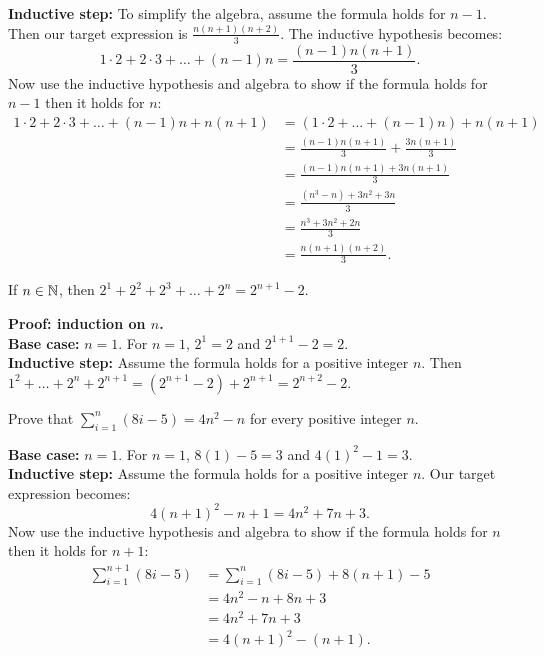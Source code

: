\documentclass{article}
\begin{document}
\textbf{Inductive step:} To simplify the algebra, assume the formula holds for $n - 1$. Then our target expression is $\frac{n(n+1)(n+2)}{3}$. The inductive hypothesis becomes:
$$1\cdot 2 + 2\cdot 3 + \ldots + (n-1)n = \frac{(n-1)n(n+1)}{3}.$$
Now use the inductive hypothesis and algebra to show if the formula holds for $n-1$ then it holds for $n$:
\begin{align*}
    1\cdot 2 + 2\cdot 3 + \ldots + (n-1)n + n(n+1) & = (1\cdot 2 + \ldots + (n-1)n) + n(n+1)     \\
                                                   & = \frac{(n-1)n(n+1)}{3} + \frac{3n(n+1)}{3} \\
                                                   & = \frac{(n-1)n(n+1) + 3n(n+1)}{3}           \\
                                                   & = \frac{(n^3 - n) + 3n^2 + 3n}{3}           \\
                                                   & = \frac{n^3 + 3n^2 + 2n}{3}                 \\
                                                   & = \frac{n(n+1)(n+2)}{3}.
\end{align*}

\begin{problem}
If $n \in \mathbb{N}$, then $2^1 + 2^2 + 2^3 + \ldots + 2^n = 2^{n+1} - 2$.
\end{problem}

\textbf{Proof: induction on $n$.}
\\

\textbf{Base case:} $n = 1$. For $n = 1$, $2^1 = 2$ and $2^{1+1} - 2 = 2$.
\\

\textbf{Inductive step:} Assume the formula holds for a positive integer $n$. Then $1^2 + \ldots + 2^n + 2^{n+1} = (2^{n+1} - 2) + 2^{n+1} = 2^{n+2} - 2$.

\begin{problem}
Prove that $\sum\limits_{i=1}^n (8i - 5) = 4n^2 - n$ for every positive integer $n$.
\end{problem}

\textbf{Base case:} $n = 1$. For $n = 1$, $8(1) - 5 = 3$ and $4(1)^2 - 1 = 3$.
\\

\textbf{Inductive step:} Assume the formula holds for a positive integer $n$. Our target expression becomes:
$$4(n+1)^2 - n+1 = 4n^2 + 7n + 3.$$
Now use the inductive hypothesis and algebra to show if the formula holds for $n$ then it holds for $n+1$:
\begin{align*}
    \sum_{i=1}^{n+1} (8i - 5) & = \sum_{i=1}^{n} (8i - 5) + 8(n+1) - 5 \\
                              & = 4n^2 - n + 8n + 3                    \\
                              & = 4n^2 + 7n + 3                        \\
                              & = 4(n+1)^2 - (n+1).
\end{align*}
\end{document}
